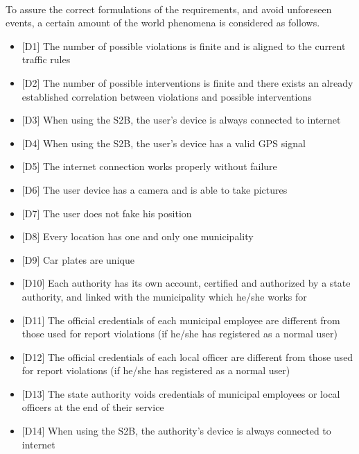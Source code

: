 			\paragraph{}
				To assure the correct formulations of the requirements, and avoid unforeseen events, a certain amount of the world phenomena is considered as follows.
				\begin{itemize}
					\item {[D1]} The number of possible violations is finite and is aligned to the current traffic rules
					\item {[D2]} The number of possible interventions is finite and there exists an already established correlation between violations and possible interventions
					\item {[D3]} When using the S2B, the user's device is always connected to internet
					\item {[D4]} When using the S2B, the user's device has a valid GPS signal
					\item {[D5]} The internet connection works properly without failure
					\item {[D6]} The user device has a camera and is able to take pictures
					\item {[D7]} The user does not fake his position
					\item {[D8]} Every location has one and only one municipality
					\item {[D9]} Car plates are unique
					\item {[D10]} Each authority has its own account, certified and authorized by a state authority, and linked with the municipality which he/she works for
					\item {[D11]} The official credentials of each municipal employee are different from those used for report violations (if he/she has registered as a normal user)
					\item {[D12]} The official credentials of each local officer are different from those used for report violations (if he/she has registered as a normal user)
					\item {[D13]} The state authority voids credentials of municipal employees or local officers at the end of their service
					\item {[D14]} When using the S2B, the authority's device is always connected to internet
				\end{itemize}